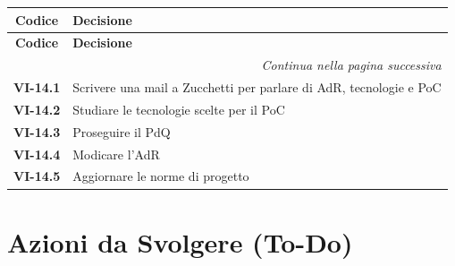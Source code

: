 \renewcommand{\arraystretch}{1.3}
\vspace{-0.3cm}
\noindent
\begin{longtable}{c p{12cm}}
	\toprule
	\textbf{Codice} & \textbf{Decisione} \\
	\midrule
	\endfirsthead

	\toprule
	\textbf{Codice} & \textbf{Decisione} \\
	\midrule
	\endhead

	\midrule
	\multicolumn{2}{r}{\textit{Continua nella pagina successiva}} \\
	\midrule
	\endfoot

	\bottomrule
	\endlastfoot

	
    \textbf{VI-14.1} & Scrivere una mail a Zucchetti per parlare di AdR, tecnologie e PoC \\[4pt]

    \textbf{VI-14.2} & Studiare le tecnologie scelte per il PoC \\[4pt]

    \textbf{VI-14.3} & Proseguire il PdQ \\[4pt]

    \textbf{VI-14.4} & Modicare l'AdR \\[4pt]

    \textbf{VI-14.5} & Aggiornare le norme di progetto \\[4pt]

\end{longtable}

\section{Azioni da Svolgere (To-Do)}

